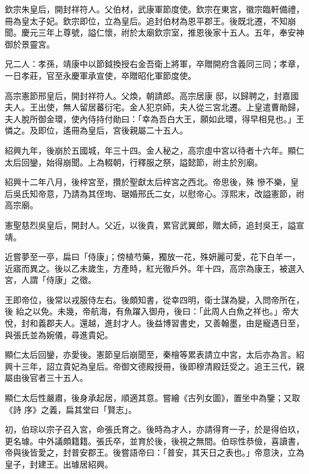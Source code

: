 \begin{pinyinscope}
 欽宗朱皇后，開封祥符人。父伯材，武康軍節度使。欽宗在東宮，徽宗臨軒備禮，冊為皇太子妃。欽宗即位，立為皇后。追封伯材為恩平郡王。後既北遷，不知崩聞。慶元三年上尊號，謚仁懷，祔於太廟欽宗室，推恩後家十五人。五年，奉安神御於景靈宮。



 兄二人：孝孫，靖康中以節鉞換授右金吾衛上將軍，卒贈開府含義同三同；孝章，一日孝莊，官至永慶軍承宣使，卒贈昭化軍節度使。



 高宗憲節邢皇后，開封祥符人。父煥，朝請郎。高宗居康
 邸，以歸聘之，封嘉國夫人。王出使，無人留居蕃衍宅。金人犯京師，夫人從三宮北遷。上皇遣曹勛歸，夫人脫所御金環，使內侍持付勛曰：「幸為吾白大王，願如此環，得早相見也。」王憐之。及即位，遙冊為皇后，宮後親屬二十五人。



 紹興九年，後崩於五國城，年三十四。金人秘之，高宗虛中宮以待者十六年。顯仁太后回鑾，始得崩聞。上為輟朝，行釋服之祭，謚懿節，祔主於別廟。



 紹興十二年八月，後梓宮至，攢於聖獻太后梓宮之西北。帝思後，殊
 慘不樂，皇后吳氏知帝意，乃請為其侄珣、琚婚邢氏二女，以慰帝心。淳熙末，改謚憲節，祔高宗廟。



 憲聖慈烈吳皇后，開封人。父近，以後貴，累官武翼郎，贈太師，追封吳王，謚宣靖。



 近嘗夢至一亭，扁曰「侍康」；傍植芍藥，獨放一花，殊妍麗可愛，花下白羊一，近寤而異之。後以乙未歲生，方產時，紅光徹戶外。年十四，高宗為康王，被選入宮，人謂「侍康」之徵。



 王即帝位，後常以戎服侍左右。後頗知書，從幸四明，衛士謀為變，入問帝所在，後
 紿之以免。未幾，帝航海，有魚躍入御舟，後曰：「此周人白魚之祥也。」帝大悅，封和義郡夫人。還越，進封才人。後益博習書史，又善翰墨，由是寵遇日至，與張氏並為婉儀，尋進貴妃。



 顯仁太后回鑾，亦愛後。憲節皇后崩聞至，秦檜等累表請立中宮，太后亦為言。紹興十三年，詔立貴妃為皇后。帝御文德殿授冊，後即穆清殿廷受之。追王三代，親屬由後官者三十五人。



 顯仁太后性嚴肅，後身承起居，順適其意。嘗繪《古列女圖》，置坐中為鑒；又取《詩
 序》之義，扁其堂曰「賢志」。



 初，伯琮以宗子召入宮，命張氏育之。後時為才人，亦請得育一子，於是得伯玖，更名璩。中外議頗籍籍。張氏卒，並育於後，後視之無間。伯琮性恭儉，喜讀書，帝與後皆愛之，封普安郡王。後嘗語帝曰：「普安，其天日之表也。」帝意決，立為皇子，封建王。出璩居紹興。




\end{pinyinscope}
